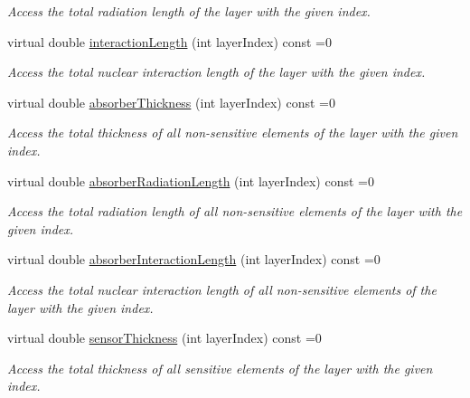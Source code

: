 \begin{DoxyCompactItemize}
\begin{DoxyCompactList}\small\item\em Access the total radiation length of the layer with the given index. \item\end{DoxyCompactList}\item 
virtual double \hyperlink{class_d_d4hep_1_1_d_d_rec_1_1_layering_extension_aa7959c9c384c0f5ffcd066c5dc01514f}{interactionLength} (int layerIndex) const =0
\begin{DoxyCompactList}\small\item\em Access the total nuclear interaction length of the layer with the given index. \item\end{DoxyCompactList}\item 
virtual double \hyperlink{class_d_d4hep_1_1_d_d_rec_1_1_layering_extension_ab4c19a0eccfd5cffc6816fa3b0ec9fb7}{absorberThickness} (int layerIndex) const =0
\begin{DoxyCompactList}\small\item\em Access the total thickness of all non-\/sensitive elements of the layer with the given index. \item\end{DoxyCompactList}\item 
virtual double \hyperlink{class_d_d4hep_1_1_d_d_rec_1_1_layering_extension_aca33441136624022aa7414895ba81fef}{absorberRadiationLength} (int layerIndex) const =0
\begin{DoxyCompactList}\small\item\em Access the total radiation length of all non-\/sensitive elements of the layer with the given index. \item\end{DoxyCompactList}\item 
virtual double \hyperlink{class_d_d4hep_1_1_d_d_rec_1_1_layering_extension_af18b1293c0631bd55798e7c73eddeb6b}{absorberInteractionLength} (int layerIndex) const =0
\begin{DoxyCompactList}\small\item\em Access the total nuclear interaction length of all non-\/sensitive elements of the layer with the given index. \item\end{DoxyCompactList}\item 
virtual double \hyperlink{class_d_d4hep_1_1_d_d_rec_1_1_layering_extension_a06a960f9de84690eb3383f89d1aada13}{sensorThickness} (int layerIndex) const =0
\begin{DoxyCompactList}\small\item\em Access the total thickness of all sensitive elements of the layer with the given index. \item\end{DoxyCompactList}\item 

\end{DoxyCompactItemize}

